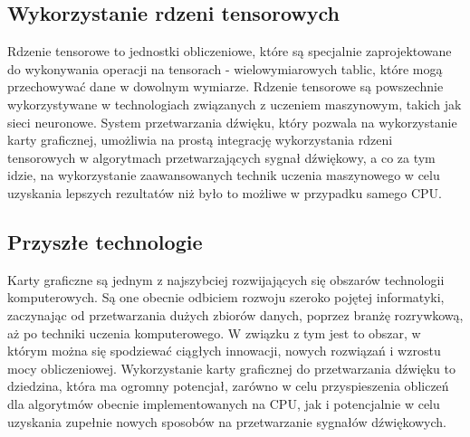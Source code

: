 \subsection{Wykorzystanie rdzeni tensorowych}
Rdzenie tensorowe to jednostki obliczeniowe, które są specjalnie zaprojektowane do wykonywania operacji na tensorach - wielowymiarowych tablic, które mogą przechowywać dane w dowolnym wymiarze. Rdzenie tensorowe są powszechnie wykorzystywane w technologiach związanych z uczeniem maszynowym, takich jak sieci neuronowe. System przetwarzania dźwięku, który pozwala na wykorzystanie karty graficznej, umożliwia na prostą integrację wykorzystania rdzeni tensorowych w algorytmach przetwarzających sygnał dźwiękowy, a co za tym idzie, na wykorzystanie zaawansowanych technik uczenia maszynowego w celu uzyskania lepszych rezultatów niż było to możliwe w przypadku samego CPU.

\subsection{Przyszłe technologie}
Karty graficzne są jednym z najszybciej rozwijających się obszarów technologii komputerowych. Są one obecnie odbiciem rozwoju szeroko pojętej informatyki, zaczynając od przetwarzania dużych zbiorów danych, poprzez branżę rozrywkową, aż po techniki uczenia komputerowego. W związku z tym jest to obszar, w którym można się spodziewać ciągłych innowacji, nowych rozwiązań i wzrostu mocy obliczeniowej. Wykorzystanie karty graficznej do przetwarzania dźwięku to dziedzina, która ma ogromny potencjał, zarówno w celu przyspieszenia obliczeń dla algorytmów obecnie implementowanych na CPU, jak i potencjalnie w celu uzyskania zupełnie nowych sposobów na przetwarzanie sygnałów dźwiękowych.

